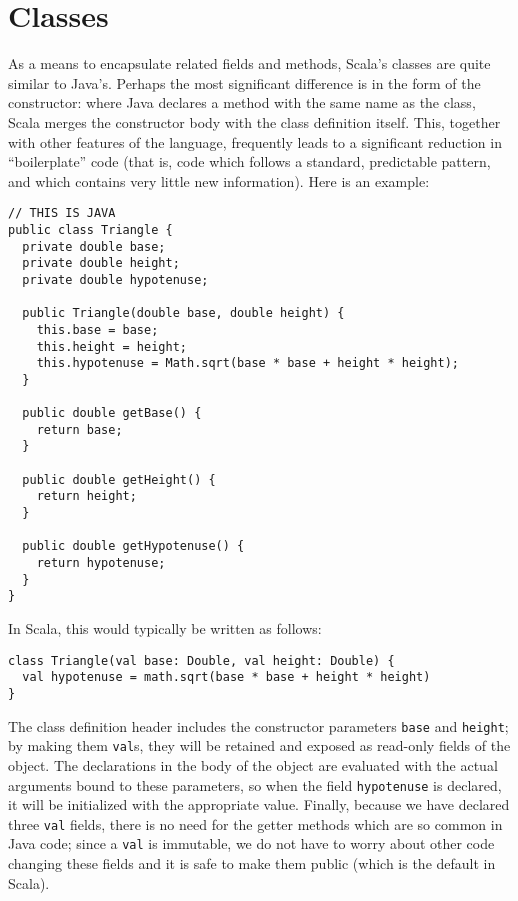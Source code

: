 \section{Classes}
As a means to encapsulate related fields and methods, Scala's classes are quite similar to Java's. Perhaps the most significant difference is in the form of the constructor: where Java declares a method with the same name as the class, Scala merges the constructor body with the class definition itself. This, together with other features of the language, frequently leads to a significant reduction in ``boilerplate'' code (that is, code which follows a standard, predictable pattern, and which contains very little new information). Here is an example:
\begin{verbatim}
// THIS IS JAVA
public class Triangle {
  private double base;
  private double height;
  private double hypotenuse;

  public Triangle(double base, double height) {
    this.base = base;
    this.height = height;
    this.hypotenuse = Math.sqrt(base * base + height * height);
  }

  public double getBase() {
    return base;
  }

  public double getHeight() {
    return height;
  }

  public double getHypotenuse() {
    return hypotenuse;
  }
}
\end{verbatim}
In Scala, this would typically be written as follows:
\begin{verbatim}
class Triangle(val base: Double, val height: Double) {
  val hypotenuse = math.sqrt(base * base + height * height)
}
\end{verbatim}
The class definition header includes the constructor parameters \texttt{base} and \texttt{height}; by making them \texttt{val}s, they will be retained and exposed as read-only fields of the object. The declarations in the body of the object are evaluated with the actual arguments bound to these parameters, so when the field \texttt{hypotenuse} is declared, it will be initialized with the appropriate value. Finally, because we have declared three \texttt{val} fields, there is no need for the getter methods which are so common in Java code; since a \texttt{val} is immutable, we do not have to worry about other code changing these fields and it is safe to make them public (which is the default in Scala).

